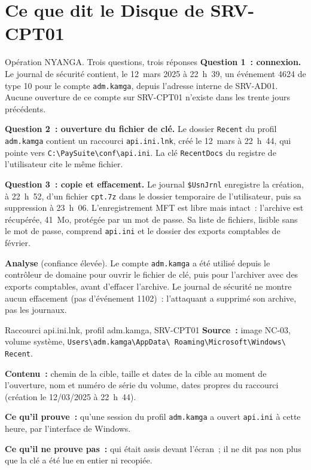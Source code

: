 \section{Ce que dit le Disque de SRV-CPT01}
\label{sec:c04-nyanga}

\begin{boxscenario}{Opération NYANGA. Trois questions, trois réponses}
\textbf{Question 1~: connexion.} Le journal de sécurité contient, le
12~mars 2025 à 22~h~39, un événement 4624 de type 10 pour le compte
\texttt{adm.kamga}, depuis l'adresse interne de SRV-AD01. Aucune ouverture
de ce compte sur SRV-CPT01 n'existe dans les trente jours précédents.

\textbf{Question 2~: ouverture du fichier de clé.} Le dossier \texttt{Recent}
du profil \texttt{adm.kamga} contient un raccourci \texttt{api.ini.lnk},
créé le 12~mars à 22~h~44, qui pointe vers
\texttt{C:\textbackslash PaySuite\textbackslash conf\textbackslash api.ini}.
La clé \texttt{RecentDocs} du registre de l'utilisateur cite le même
fichier.

\textbf{Question 3~: copie et effacement.} Le journal \texttt{\$UsnJrnl}
enregistre la création, à 22~h~52, d'un fichier \texttt{cpt.7z} dans le
dossier temporaire de l'utilisateur, puis sa suppression à 23~h~06.
L'enregistrement MFT est libre mais intact~: l'archive est récupérée, 41~Mo,
protégée par un mot de passe. Sa liste de fichiers, lisible sans le mot de
passe, comprend \texttt{api.ini} et le dossier des exports comptables de
février.

\medskip
\textbf{Analyse} (confiance élevée). Le compte \texttt{adm.kamga} a été
utilisé depuis le contrôleur de domaine pour ouvrir le fichier de clé, puis
pour l'archiver avec des exports comptables, avant d'effacer l'archive. Le
journal de sécurité ne montre aucun effacement (pas d'événement 1102)~:
l'attaquant a supprimé son archive, pas les journaux.
\end{boxscenario}

\begin{boxobjet}{Raccourci api.ini.lnk, profil adm.kamga, SRV-CPT01}
\textbf{Source~:} image NC-03, volume système,
\texttt{Users\textbackslash adm.kamga\textbackslash AppData\textbackslash
Roaming\textbackslash Microsoft\textbackslash Windows\textbackslash
Recent}.

\textbf{Contenu~:} chemin de la cible, taille et dates de la cible au moment
de l'ouverture, nom et numéro de série du volume, dates propres du
raccourci (création le 12/03/2025 à 22~h~44).

\textbf{Ce qu'il prouve~:} qu'une session du profil \texttt{adm.kamga} a
ouvert \texttt{api.ini} à cette heure, par l'interface de Windows.

\textbf{Ce qu'il ne prouve pas~:} qui était assis devant l'écran~; il ne dit
pas non plus que la clé a été lue en entier ni recopiée.
\end{boxobjet}

